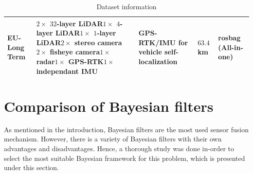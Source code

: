 \begin{table}[h]
\begin{tabular}{ |p{}|p{}|p{}|p{}|p{}|  }
	\hline
	EU-Long Term & $2\times$ $32$-layer LiDAR\newline $1\times$ $4$-layer LiDAR\newline $1\times$ $1$-layer LiDAR\newline $2\times$ stereo camera \newline $2\times$ fisheye camera\newline $1\times$ radar\newline $1\times$ GPS-RTK\newline $1\times$ independant IMU\newline & GPS-RTK/IMU for vehicle self-localization & $63.4$ km & rosbag (All-in-one)\\
	\hline
\end{tabular}
\caption{Dataset information}
\label{table:pa:Datasets}
\vspace{0.5cm}
\end{table}








\section{Comparison of Bayesian filters}
As mentioned in the introduction, Bayesian filters are the most used sensor fusion mechanism. However, there is a variety of Bayesian filters with their own advantages and disadvantages. Hence, a thorough study was done in-order to select the most suitable Bayesian framework for this problem, which is presented under this section.

